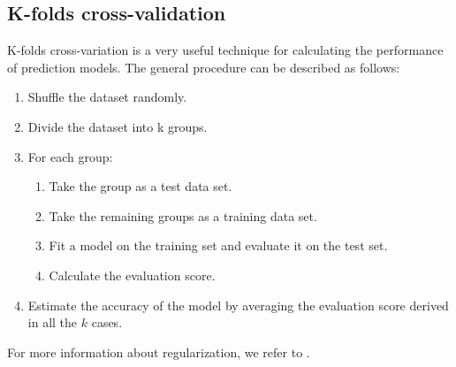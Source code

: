 \documentclass [11pt]{article}
\begin{document}
\subsection{K-folds cross-validation}
\label{sec_kcross}
K-folds cross-variation is a very useful technique for calculating the performance of prediction models. The general procedure can be described as follows:
\begin{enumerate}
\item Shuffle the dataset randomly.
\item Divide the dataset into k groups.
\item For each group:
\begin{enumerate}
\item Take the group as a test data set.
\item Take the remaining groups as a training data set.
\item Fit a model on the training set and evaluate it on the test set.
\item Calculate the evaluation score.
\end{enumerate}
\item Estimate the accuracy of the model by averaging the evaluation score derived in all the $k$ cases.
\end{enumerate}
For more information about regularization, we refer to \cite{TRJ}.
\end{document}
